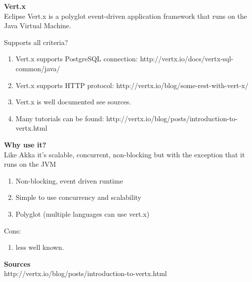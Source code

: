 
\textbf{Vert.x} \\
Eclipse Vert.x is a polyglot event-driven application framework that runs on the Java Virtual Machine.

Supports all criteria? \\
\begin{enumerate}
	\item Vert.x supports PostgreSQL connection: http://vertx.io/docs/vertx-sql-common/java/
	\item Vert.x supports HTTP protocol: http://vertx.io/blog/some-rest-with-vert-x/
	\item Vert.x is well documented see sources.
	\item Many tutorials can be found: http://vertx.io/blog/posts/introduction-to-vertx.html
\end{enumerate}


\textbf{Why use it?} \\
 Like Akka it's scalable, concurrent, non-blocking but with the exception that it runs on the JVM\\

\begin{enumerate}
	\item Non-blocking, event driven runtime
	\item Simple to use concurrency and scalability
	\item Polyglot (multiple languages can use vert.x)
\end{enumerate}
Cons:
\begin{enumerate}
	\item less well known.
\end{enumerate}

\textbf{Sources}\\
http://vertx.io/blog/posts/introduction-to-vertx.html